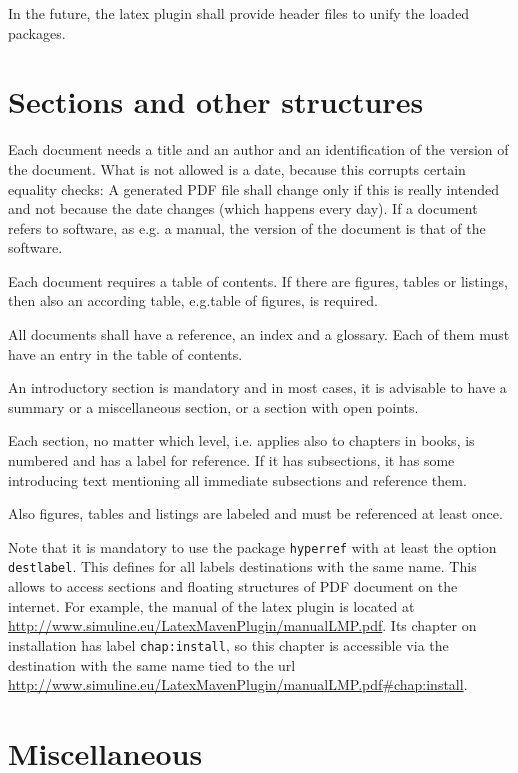 \documentclass[a4paper,12pt]{article}
\begin{document}
In the future, the latex plugin shall provide header files to unify the loaded packages. 

\section{Sections and other structures}\label{sec:secs}

Each document needs a title and an author 
and an identification of the version of the document. 
What is not allowed is a date, because this corrupts certain equality checks: 
A generated PDF file shall change only 
if this is really intended and not because the date changes 
(which happens every day).  
If a document refers to software, as e.g\@. a manual, 
the version of the document is that of the software. 

Each document requires a table of contents. 
If there are figures, tables or listings, then also an according table, 
e.g.\@ table of figures, is required. 

All documents shall have a reference, an index and a glossary. 
Each of them must have an entry in the table of contents. 

An introductory section is mandatory and in most cases, 
it is advisable to have a summary or a miscellaneous section, 
or a section with open points. 

Each section, no matter which level, i.e. applies also to chapters in books, 
is numbered and has a label for reference. 
If it has subsections, it has some introducing text mentioning all immediate subsections 
and reference them. 

Also figures, tables and listings are labeled and must be referenced at least once. 

Note that it is mandatory to use the package \texttt{hyperref} 
with at least the option \texttt{destlabel}. 
This defines for all labels destinations with the same name. 
This allows to access sections and floating structures 
of PDF document on the internet. 
For example, the manual of the latex plugin 
is located at \url{http://www.simuline.eu/LatexMavenPlugin/manualLMP.pdf}. 
Its chapter on installation has label \texttt{chap:install}, 
so this chapter is accessible 
via the destination with the same name 
tied to the url 
\url{http://www.simuline.eu/LatexMavenPlugin/manualLMP.pdf#chap:install}. 


\section{Miscellaneous}\label{sec:misc}
\end{document}
